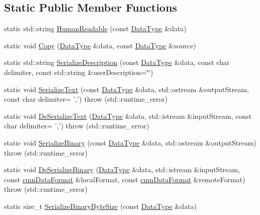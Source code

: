 \subsection*{Static Public Member Functions}
\begin{DoxyCompactItemize}
\item 
static std\-::string \hyperlink{classcmn_data_a486363e19d02f447104d14d3b9dcf2fa}{Human\-Readable} (const \hyperlink{classcmn_data_a353bd6bb0af651b6301e5e2e34587da2}{Data\-Type} \&data)
\item 
static void \hyperlink{classcmn_data_a0fcd362f10c5b31cf289f4fcd7ad3ea2}{Copy} (\hyperlink{classcmn_data_a353bd6bb0af651b6301e5e2e34587da2}{Data\-Type} \&data, const \hyperlink{classcmn_data_a353bd6bb0af651b6301e5e2e34587da2}{Data\-Type} \&source)
\item 
static std\-::string \hyperlink{classcmn_data_a31e9cd60cd1ff6ea665db60d90e3fbe1}{Serialize\-Description} (const \hyperlink{classcmn_data_a353bd6bb0af651b6301e5e2e34587da2}{Data\-Type} \&data, const char delimiter, const std\-::string \&user\-Description=\char`\"{}\char`\"{})
\item 
static void \hyperlink{classcmn_data_ad2b3503564e579511c78aaa891f864f5}{Serialize\-Text} (const \hyperlink{classcmn_data_a353bd6bb0af651b6301e5e2e34587da2}{Data\-Type} \&data, std\-::ostream \&output\-Stream, const char delimiter= ',')  throw (std\-::runtime\-\_\-error)
\item 
static void \hyperlink{classcmn_data_a7daf61ca319d4f7835a856fb45741ef2}{De\-Serialize\-Text} (\hyperlink{classcmn_data_a353bd6bb0af651b6301e5e2e34587da2}{Data\-Type} \&data, std\-::istream \&input\-Stream, const char delimiter= ',')  throw (std\-::runtime\-\_\-error)
\item 
static void \hyperlink{classcmn_data_a0b625171f6eb752525fb8c6cac5206f0}{Serialize\-Binary} (const \hyperlink{classcmn_data_a353bd6bb0af651b6301e5e2e34587da2}{Data\-Type} \&data, std\-::ostream \&output\-Stream)  throw (std\-::runtime\-\_\-error)
\item 
static void \hyperlink{classcmn_data_a26db3364e7ccd6296cc833c8ce060be1}{De\-Serialize\-Binary} (\hyperlink{classcmn_data_a353bd6bb0af651b6301e5e2e34587da2}{Data\-Type} \&data, std\-::istream \&input\-Stream, const \hyperlink{classcmn_data_format}{cmn\-Data\-Format} \&local\-Format, const \hyperlink{classcmn_data_format}{cmn\-Data\-Format} \&remote\-Format)  throw (std\-::runtime\-\_\-error)
\item 
static size\-\_\-t \hyperlink{classcmn_data_a131f5c0465a4985ba49c1cf439a267db}{Serialize\-Binary\-Byte\-Size} (const \hyperlink{classcmn_data_a353bd6bb0af651b6301e5e2e34587da2}{Data\-Type} \&data)

\end{DoxyCompactItemize}
